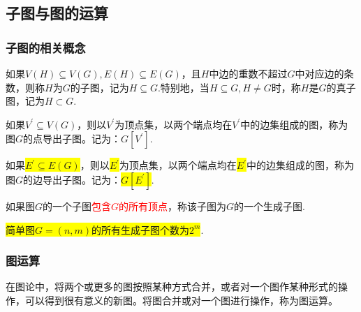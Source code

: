 \subsection{子图与图的运算}
\subsubsection{子图的相关概念}
\noindent {\bfseries \textcolor{ecolor}{子图的定义：}}
\begin{definition}[子图]
	如果$V(H)\subseteq V(G), E(H)\subseteq E(G)$，且$H$中边的重数不超过$G$中对应边的条数，则称$H$为$G$的子图，记为$H\subseteq G$.特别地，当$H\subseteq G, H\ne G$时，称$H$是$G$的真子图，记为$H \subset G$.
\end{definition}

\noindent {\bfseries \textcolor{ecolor}{点与边的导出子图：}}
\begin{definition}[顶点导出子图]
	如果$V^{'}\subseteq V(G)$，则以$V^{'}$为顶点集，以两个端点均在$V^{'}$中的边集组成的图，称为图$G$的点导出子图。记为：$G[V^{'}]$.
\end{definition}


\begin{definition}[边导出子图]
	如果\colorbox{yellow}{$E^{'}\subseteq E(G)$}，则以\colorbox{yellow}{$E^{'}$}为顶点集，以两个端点均在\colorbox{yellow}{$E^{'}$}中的边集组成的图，称为图$G$的边导出子图。记为：\colorbox{yellow}{$G[E^{'}]$}.
\end{definition}

\noindent {\bfseries \textcolor{ecolor}{图的生成子图：}}
\begin{definition}[生成子图]
如果图$G$的一个子图\textcolor{red}{包含$G$的所有顶点}，称该子图为$G$的一个生成子图.
\end{definition}
\begin{theorem}
	\colorbox{yellow}{简单图$G=(n, m)$的所有生成子图个数为$2^{m}$}.
\end{theorem}

\subsubsection{图运算}
在图论中，将两个或更多的图按照某种方式合并，或者对一个图作某种形式的操作，可以得到很有意义的新图。将图合并或对一个图进行操作，称为图运算。

